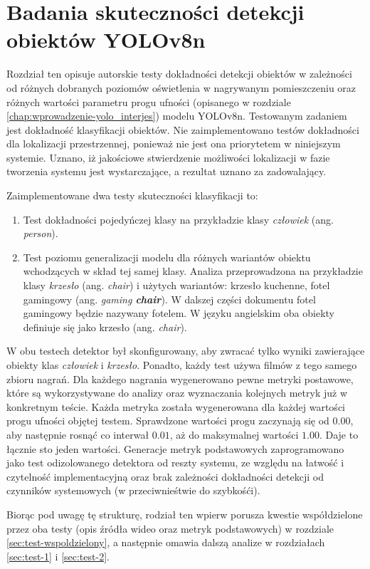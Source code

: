 \chapter{Badania skuteczności detekcji obiektów YOLOv8n}
\label{chap:badania-skutecznosci}
Rozdział ten opisuje autorskie testy dokładności detekcji obiektów w zależności od różnych dobranych poziomów oświetlenia w nagrywanym pomieszczeniu oraz różnych wartości parametru progu ufności (opisanego w rozdziale \ref{chap:wprowadzenie-yolo_interjes}) modelu YOLOv8n. Testowanym zadaniem jest dokładność klasyfikacji obiektów. Nie zaimplementowano testów dokładności dla lokalizacji przestrzennej, ponieważ nie jest ona priorytetem w niniejszym systemie. Uznano, iż jakościowe stwierdzenie możliwości lokalizacji w fazie tworzenia systemu jest wystarczające, a rezultat uznano za zadowalający. 

Zaimplementowane dwa testy skuteczności klasyfikacji to:
\begin{enumerate}
    \item Test dokładności pojedyńczej klasy na przykładzie klasy \emph{człowiek} (ang. \emph{person}). 
    \item  Test poziomu generalizacji modelu dla różnych wariantów obiektu wchodzących w skład tej samej klasy. Analiza przeprowadzona na przykładzie klasy \emph{krzesło} (ang. \emph{chair}) i użytych wariantów: krzesło kuchenne, fotel gamingowy (ang. \emph{gaming \textbf{chair}}). W dalszej części dokumentu fotel gamingowy będzie nazywany fotelem. W języku angielskim oba obiekty definiuje się jako krzesło (ang. \emph{chair}).  
\end{enumerate}
W obu testech detektor był skonfigurowany, aby zwracać tylko wyniki zawierające obiekty klas \emph{człowiek} i \emph{krzesło}. Ponadto, każdy test używa filmów z tego samego zbioru nagrań. Dla każdego nagrania wygenerowano pewne metryki postawowe, które są wykorzystywane do analizy oraz wyznaczania kolejnych metryk już w konkretnym teście. Każda metryka została wygenerowana dla każdej wartości progu ufności objętej testem. Sprawdzone wartości progu zaczynają się od $0.00$, aby następnie rosnąć co interwał $0.01$, aż do maksymalnej wartości $1.00$. Daje to łącznie sto jeden wartości. Generacje metryk podstawowych zaprogramowano jako test odizolowanego detektora od reszty systemu, ze względu na łatwość i czytelność implementacyjną oraz brak zależności dokładności detekcji od czynników systemowych (w przeciwnieśtwie do szybkośći).  

Biorąc pod uwagę tę strukturę, rodział ten wpierw porusza kwestie współdzielone przez oba testy (opis źródła wideo oraz metryk podstawowych) w rozdziale \ref{sec:test-wspoldzielony}, a następnie omawia dalszą analize w rozdziałach \ref{sec:test-1} i \ref{sec:test-2}.
 
